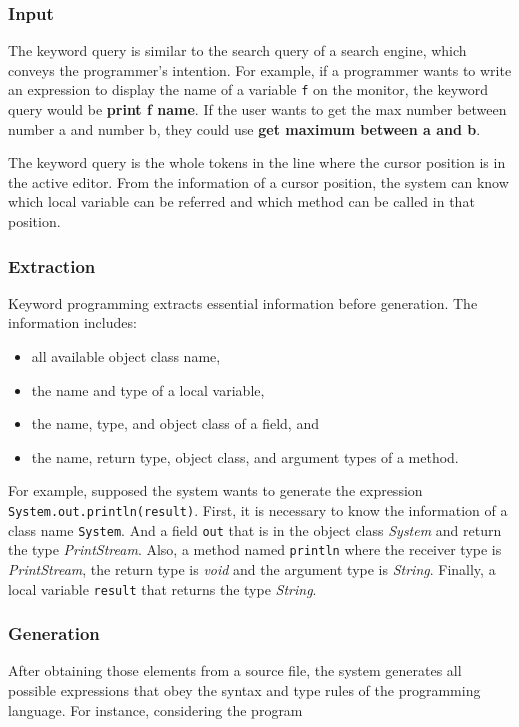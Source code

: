 \documentclass[PRO,english]{ipsj}
\begin{document}
\subsubsection{Input}
The keyword query is similar to the search query of a search engine, which conveys the programmer’s intention. For example, if a programmer wants to write an expression to display the name of a variable \texttt{f} on the monitor, the keyword query would be \textbf{print f name}. If the user wants to get the max number between number a and number b, they could use \textbf{get maximum between a and b}.

The keyword query is the whole tokens in the line where the cursor position is in the active editor. From the information of a cursor position, the system can know which local variable can be referred and which method can be called in that position.

\subsubsection{Extraction}
Keyword programming extracts essential information before generation. The information includes:
\begin{itemize}
\item all available object class name,
\item the name and type of a local variable,
\item the name, type, and object class of a field, and
\item the name, return type, object class, and argument types of a method.
\end{itemize}

For example, supposed the system wants to generate the expression \texttt{System.out.println(result)}. First, it is necessary to know the information of a class name \texttt{System}. And a field \texttt{out} that is in the object class \textit{System} and return the type \textit{PrintStream}. Also, a method named \texttt{println} where the receiver type is \textit{PrintStream}, the return type is \textit{void} and the argument type is \textit{String}. Finally, a local variable \texttt{result} that returns the type \textit{String}.

\subsubsection{Generation}
After obtaining those elements from a source file, the system generates all possible expressions that obey the syntax and type rules of the programming language. For instance, considering the program
\end{document}
